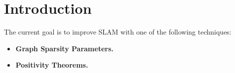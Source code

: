 \section{Introduction}

The current goal is to improve SLAM with one of the following techniques:
\begin{itemize}
    \item \textbf{Graph Sparsity Parameters.}
    \item \textbf{Positivity Theorems.}
\end{itemize}